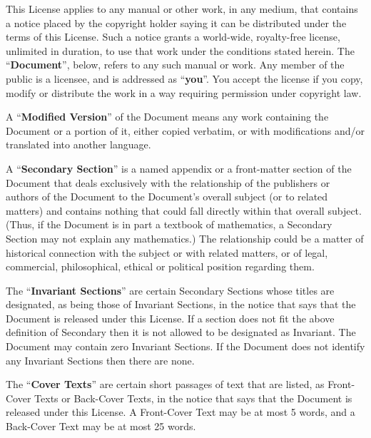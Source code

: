 \documentclass[10pt,a4paper,ngerman,titlepage,tocindentauto]{article}
\begin{document}
\begin{multicols}{3}
{					This License applies to any manual or other work, in any medium, that
					contains a notice placed by the copyright holder saying it can be
					distributed under the terms of this License.  Such a notice grants a
					world-wide, royalty-free license, unlimited in duration, to use that
					work under the conditions stated herein.  The ``\textbf{Document}'', below,
					refers to any such manual or work.  Any member of the public is a
					licensee, and is addressed as ``\textbf{you}''.  You accept the license if you
					copy, modify or distribute the work in a way requiring permission
					under copyright law.

					A ``\textbf{Modified Version}'' of the Document means any work containing the
					Document or a portion of it, either copied verbatim, or with
					modifications and/or translated into another language.

					A ``\textbf{Secondary Section}'' is a named appendix or a front-matter section of
					the Document that deals exclusively with the relationship of the
					publishers or authors of the Document to the Document's overall subject
					(or to related matters) and contains nothing that could fall directly
					within that overall subject.  (Thus, if the Document is in part a
					textbook of mathematics, a Secondary Section may not explain any
					mathematics.)  The relationship could be a matter of historical
					connection with the subject or with related matters, or of legal,
					commercial, philosophical, ethical or political position regarding
					them.

					The ``\textbf{Invariant Sections}'' are certain Secondary Sections whose titles
					are designated, as being those of Invariant Sections, in the notice
					that says that the Document is released under this License.  If a
					section does not fit the above definition of Secondary then it is not
					allowed to be designated as Invariant.  The Document may contain zero
					Invariant Sections.  If the Document does not identify any Invariant
					Sections then there are none.

					The ``\textbf{Cover Texts}'' are certain short passages of text that are listed,
					as Front-Cover Texts or Back-Cover Texts, in the notice that says that
					the Document is released under this License.  A Front-Cover Text may
					be at most 5 words, and a Back-Cover Text may be at most 25 words.

}
\end{multicols}
\end{document}
